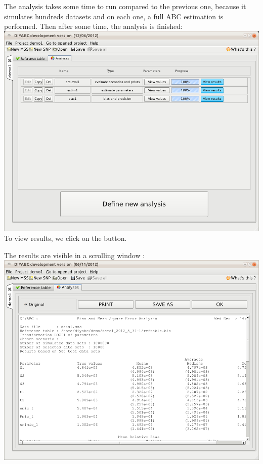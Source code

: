The analysis takes some time to run compared to the previous one, because it simulates hundreds datasets and on each one, a full ABC estimation is performed. Then after some time, the analysis is finished: \\

\includegraphics[scale=0.35]{gui_pictures/Capture-DIYABC-51.png} \\

To view results, we click on the   button. 

\newpage

The results are visible in a scrolling window :\\

\includegraphics[scale=0.32]{gui_pictures/Capture-DIYABC-52a.png} \\

